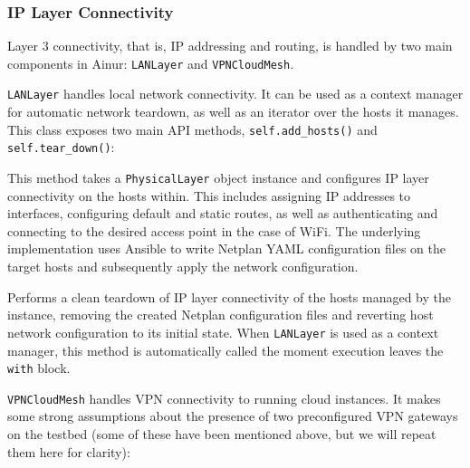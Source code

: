 \subsubsection{\ac{IP} Layer Connectivity}\label{sec:layer3}

Layer 3 connectivity, that is, \ac{IP} addressing and routing, is handled by two main components in Ainur: \texttt{LANLayer} and \texttt{VPNCloudMesh}.

\texttt{LANLayer} handles local network connectivity.
It can be used as a context manager for automatic network teardown, as well as an iterator over the hosts it manages.
This class exposes two main \ac{API} methods, \texttt{self.add_hosts()} and \texttt{self.tear_down()}:
\begin{description}[]
    \item[\texttt{LANLayer.add_hosts(self, layer2)}]
    This method takes a \texttt{PhysicalLayer} object instance and configures \ac{IP} layer connectivity on the hosts within.
    This includes assigning \ac{IP} addresses to interfaces, configuring default and static routes, as well as authenticating and connecting to the desired access point in the case of WiFi.
    The underlying implementation uses Ansible to write Netplan YAML configuration files on the target hosts and subsequently apply the network configuration.

    \item[\texttt{LANLayer.tear_down(self)}]
    Performs a clean teardown of \ac{IP} layer connectivity of the hosts managed by the instance, removing the created Netplan configuration files and reverting host network configuration to its initial state.
    When \texttt{LANLayer} is used as a context manager, this method is automatically called the moment execution leaves the \texttt{with} block.
\end{description}

\texttt{VPNCloudMesh}\label{sec:vpn} handles \ac{VPN} connectivity to running cloud instances.
It makes some strong assumptions about the presence of two preconfigured \ac{VPN} gateways on the testbed (some of these have been mentioned above, but we will repeat them here for clarity):

